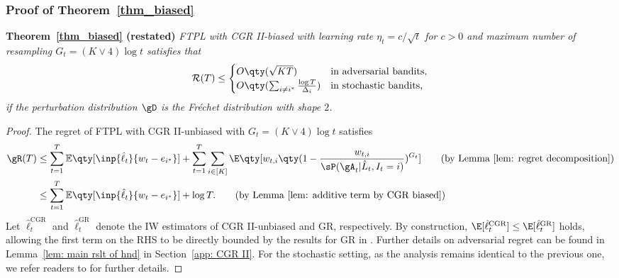 \subsubsection{Proof of Theorem~\ref{thm_biased}}
\textbf{Theorem~\ref{thm_biased} (restated)}
\textit{FTPL with CGR II-biased with learning rate $\eta_t = c/\sqrt{t}$ for $c>0$ and maximum number of resampling $G_{t}=(K\lor 4)\log t$ satisfies that
    \begin{equation*}
        \mathcal{R}(T) \leq \begin{cases}
            O\qty (\sqrt{KT})  &\text{in adversarial bandits,} \\
            O\qty(\sum_{i \ne i^*}\frac{\log T}{\Delta_i})& \text{in stochastic bandits,}
        \end{cases}
    \end{equation*}
if the perturbation distribution $\gD$ is the Fr\'{e}chet distribution with shape $2$.}
\begin{proof}
    The regret of FTPL with CGR II-unbiased with $G_t =(K\lor 4)\log t $ satisfies
    \begin{align*}
        \gR(T) &\leq \sum_{t=1}^T \mathbb{E}\qty[\inp{\hat{\ell}_t}{w_t - e_{i^*}}]
    + \sum_{t=1}^T \sum_{i\in [K]} \E\qty[w_{t,i} \qty(1-\frac{w_{t,i}}{\sP(\gA_{t}|\hat{L}_t, I_t=i)})^{G_t}] \tag{by Lemma~\ref{lem: regret decomposition}} \\
    &\leq \sum_{t=1}^T \mathbb{E}\qty[\inp{\hat{\ell}_t}{w_t - e_{i^*}}]
    + \log T .\tag{by Lemma~\ref{lem: additive term by CGR biased}}
    \end{align*}
    Let $\hat{\ell}_t^{\mathrm{CGR}}$ and $\hat{\ell}_t^{\mathrm{GR}}$ denote the IW estimators of CGR II-unbiased and GR, respectively.
    By construction, $\E[\hat{\ell}_t^{\mathrm{CGR}}] \leq \E[\hat{\ell}_t^{\mathrm{GR}}]$ holds, allowing the first term on the RHS to be directly bounded by the results for GR in \citet{pmlr-v201-honda23a}.
    Further details on adversarial regret can be found in Lemma~\ref{lem: main rslt of hnd} in Section~\ref{app: CGR II}.
    For the stochastic setting, as the analysis remains identical to the previous one, we refer readers to \citet[Theorem 2]{pmlr-v201-honda23a} for further details.
\end{proof}

